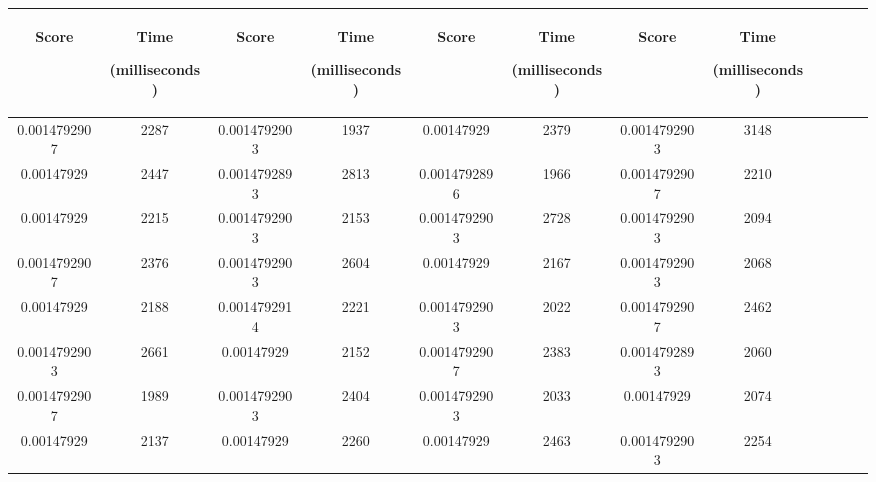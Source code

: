 \begin{table}[h]
  \centering
  \begin{tabular}{|c|c|c|c|c|c|c|c|c|c|c|c|} 
  \midrule
 \begin{sideways}Score\end{sideways}& \begin{sideways}Time\end{sideways} \begin{sideways} (milliseconds)\end{sideways}& \begin{sideways}Score\end{sideways}& \begin{sideways}Time\end{sideways}  \begin{sideways}(milliseconds)\end{sideways}& \begin{sideways}Score\end{sideways}& \begin{sideways}Time\end{sideways}  \begin{sideways}(milliseconds)\end{sideways}& \begin{sideways}Score\end{sideways}& \begin{sideways}Time\end{sideways}  \begin{sideways} (milliseconds)\end{sideways}\\
\midrule
0.0014792907&2287&0.0014792903&1937&0.00147929&2379&0.0014792903&3148\\
\midrule
0.00147929&2447&0.0014792893&2813&0.0014792896&1966&0.0014792907&2210\\
\midrule
0.00147929&2215&0.0014792903&2153&0.0014792903&2728&0.0014792903&2094\\
\midrule
0.0014792907&2376&0.0014792903&2604&0.00147929&2167&0.0014792903&2068\\
\midrule
0.00147929&2188&0.0014792914&2221&0.0014792903&2022&0.0014792907&2462\\
\midrule
0.0014792903&2661&0.00147929&2152&0.0014792907&2383&0.0014792893&2060\\
\midrule
0.0014792907&1989&0.0014792903&2404&0.0014792903&2033&0.00147929&2074\\
\midrule
0.00147929&2137&0.00147929&2260&0.00147929&2463&0.0014792903&2254\\

\end{tabular}
\end{table}
